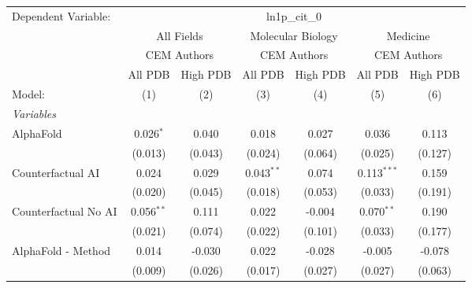 \begingroup
\centering
\begin{tabular}{lcccccc}
   \tabularnewline \midrule \midrule
   Dependent Variable: & \multicolumn{6}{c}{ln1p\_cit\_0}\\
 & \multicolumn{2}{c}{All Fields} & \multicolumn{2}{c}{Molecular Biology} & \multicolumn{2}{c}{Medicine} \\
\cmidrule(lr){2-3} \cmidrule(lr){4-5} \cmidrule(lr){6-7}
 & \multicolumn{2}{c}{CEM Authors} & \multicolumn{2}{c}{CEM Authors} & \multicolumn{2}{c}{CEM Authors} \\
\cmidrule(lr){2-3} \cmidrule(lr){4-5} \cmidrule(lr){6-7}
 & \multicolumn{1}{c}{All PDB} & \multicolumn{1}{c}{High PDB} & \multicolumn{1}{c}{All PDB} & \multicolumn{1}{c}{High PDB} & \multicolumn{1}{c}{All PDB} & \multicolumn{1}{c}{High PDB} \\
\cmidrule(lr){2-2} \cmidrule(lr){3-3} \cmidrule(lr){4-4} \cmidrule(lr){5-5} \cmidrule(lr){6-6} \cmidrule(lr){7-7}
   Model:                                                     & (1)            & (2)         & (3)          & (4)     & (5)           & (6)\\  
   \midrule
   \emph{Variables}\\
   AlphaFold                                                  & 0.026$^{*}$    & 0.040       & 0.018        & 0.027   & 0.036         & 0.113\\   
                                                              & (0.013)        & (0.043)     & (0.024)      & (0.064) & (0.025)       & (0.127)\\   
   Counterfactual AI                                          & 0.024          & 0.029       & 0.043$^{**}$ & 0.074   & 0.113$^{***}$ & 0.159\\   
                                                              & (0.020)        & (0.045)     & (0.018)      & (0.053) & (0.033)       & (0.191)\\   
   Counterfactual No AI                                       & 0.056$^{**}$   & 0.111       & 0.022        & -0.004  & 0.070$^{**}$  & 0.190\\   
                                                              & (0.021)        & (0.074)     & (0.022)      & (0.101) & (0.033)       & (0.177)\\   
   AlphaFold - Method                                         & 0.014          & -0.030      & 0.022        & -0.028  & -0.005        & -0.078\\   
                                                              & (0.009)        & (0.026)     & (0.017)      & (0.027) & (0.027)       & (0.063)\\   

\end{tabular}
